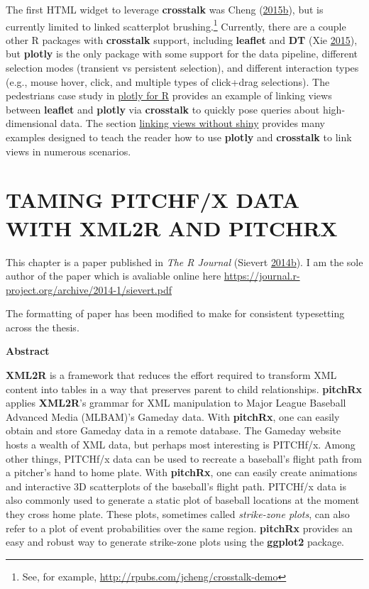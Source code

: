 \documentclass[12pt,]{isuthesis}
\let\rmarkdownfootnote\footnote%
\def\footnote{\protect\rmarkdownfootnote}
\begin{document}
The first HTML widget to leverage \textbf{crosstalk} was Cheng
(\protect\hyperlink{ref-d3scatter}{2015}\protect\hyperlink{ref-d3scatter}{b}),
but is currently limited to linked scatterplot brushing.\footnote{See,
  for example, \url{http://rpubs.com/jcheng/crosstalk-demo}} Currently,
there are a couple other R packages with \textbf{crosstalk} support,
including \textbf{leaflet} and \textbf{DT} (Xie
\protect\hyperlink{ref-DT}{2015}), but \textbf{plotly} is the only
package with some support for the data pipeline, different selection
modes (transient vs persistent selection), and different interaction
types (e.g., mouse hover, click, and multiple types of click+drag
selections). The pedestrians case study in
\protect\hyperlink{plotly-for-R}{plotly for R} provides an example of
linking views between \textbf{leaflet} and \textbf{plotly} via
\textbf{crosstalk} to quickly pose queries about high-dimensional data.
The section \protect\hyperlink{linking-views-without-shiny}{linking
views without shiny} provides many examples designed to teach the reader
how to use \textbf{plotly} and \textbf{crosstalk} to link views in
numerous scenarios.

\chapter{TAMING PITCHF/X DATA WITH XML2R AND PITCHRX}

This chapter is a paper published in \emph{The R Journal} (Sievert
\protect\hyperlink{ref-Sievert:2014a}{2014}\protect\hyperlink{ref-Sievert:2014a}{b}).
I am the sole author of the paper which is avaliable online here
\url{https://journal.r-project.org/archive/2014-1/sievert.pdf}

The formatting of paper has been modified to make for consistent
typesetting across the thesis.

\begin{center}
  \begin{Large}
    \textbf{Abstract}
  \end{Large}
\end{center}

\textbf{XML2R} is a framework that reduces the effort required to
transform XML content into tables in a way that preserves parent to
child relationships. \textbf{pitchRx} applies \textbf{XML2R}'s grammar
for XML manipulation to Major League Baseball Advanced Media (MLBAM)'s
Gameday data. With \textbf{pitchRx}, one can easily obtain and store
Gameday data in a remote database. The Gameday website hosts a wealth of
XML data, but perhaps most interesting is PITCHf/x. Among other things,
PITCHf/x data can be used to recreate a baseball's flight path from a
pitcher's hand to home plate. With \textbf{pitchRx}, one can easily
create animations and interactive 3D scatterplots of the baseball's
flight path. PITCHf/x data is also commonly used to generate a static
plot of baseball locations at the moment they cross home plate. These
plots, sometimes called \textit{strike-zone plots}, can also refer to a
plot of event probabilities over the same region. \textbf{pitchRx}
provides an easy and robust way to generate strike-zone plots using the
\textbf{ggplot2} package.
\end{document}
